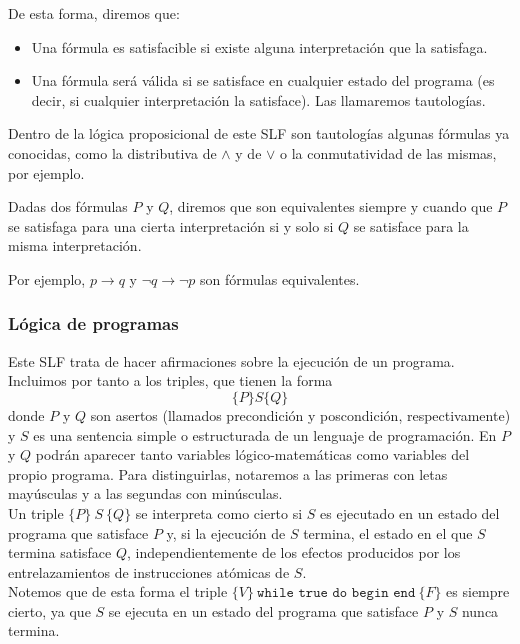 De esta forma, diremos que:
\begin{itemize}
    \item Una fórmula es satisfacible si existe alguna interpretación que la satisfaga.
    \item Una fórmula será válida si se satisface en cualquier estado del programa (es decir, si cualquier interpretación la satisface). Las llamaremos tautologías.
\end{itemize}

Dentro de la lógica proposicional de este SLF son tautologías algunas fórmulas ya conocidas, como la distributiva de $\land$ y de $\lor$ o la conmutatividad de las mismas, por ejemplo.

\begin{definicion}
    Dadas dos fórmulas $P$ y $Q$, diremos que son equivalentes siempre y cuando que $P$ se satisfaga para una cierta interpretación si y solo si $Q$ se satisface para la misma interpretación.
\end{definicion}
Por ejemplo, $p\rightarrow q$ y $\lnot q\rightarrow \lnot p$ son fórmulas equivalentes.

\subsubsection{Lógica de programas}
Este SLF trata de hacer afirmaciones sobre la ejecución de un programa. Incluimos por tanto a los triples, que tienen la forma
\begin{equation*}
    \{P\}S\{Q\}
\end{equation*}
donde $P$ y $Q$ son asertos (llamados precondición y poscondición, respectivamente) y $S$ es una sentencia simple o estructurada de un lenguaje de programación. En $P$ y $Q$ podrán aparecer tanto variables lógico-matemáticas como variables del propio programa. Para distinguirlas, notaremos a las primeras con letas mayúsculas y a las segundas con minúsculas.\\

Un triple $\{P\}\ S\ \{Q\}$ se interpreta como cierto si $S$ es ejecutado en un estado del programa que satisface $P$ y, si la ejecución de $S$ termina, el estado en el que $S$ termina satisface $Q$, independientemente de los efectos producidos por los entrelazamientos de instrucciones atómicas de $S$.\\

Notemos que de esta forma el triple $\{V\}\ \texttt{while\ true\ do\ begin\ end}\ \{F\}$ es siempre cierto, ya que $S$ se ejecuta en un estado del programa que satisface $P$ y $S$ nunca termina.

